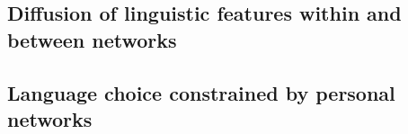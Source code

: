     \subsection{Diffusion of linguistic features within and between networks}
    \subsection{Language choice constrained by personal networks}

